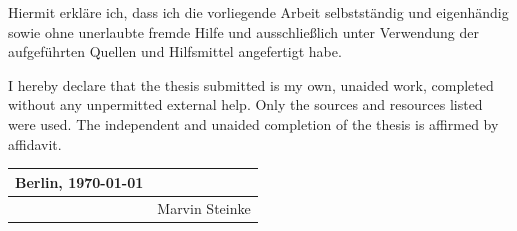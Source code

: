 \documentclass[a4paper, hidelinks]{report}
\begin{document}
\thispagestyle{empty}

Hiermit erkläre ich, dass ich die vorliegende Arbeit selbstständig und
eigenhändig sowie ohne unerlaubte fremde Hilfe und ausschließlich unter
Verwendung der aufgeführten Quellen und Hilfsmittel angefertigt habe.

\noindent I hereby declare that the thesis submitted is my own, unaided work,
completed without any unpermitted external help. Only the sources and resources
listed were used. The independent and unaided completion of the thesis is
affirmed by affidavit.

\vspace{2cm}
\hfill
{
    \renewcommand{\arraystretch}{2}
    \begin{tabular}{l l}
        Berlin, \today \hspace{1em} & \\
        \hline
                                    & Marvin Steinke \hspace{5em}
    \end{tabular}
}

\begin{abstract}
\end{abstract}

\begin{abstract}
\end{abstract}

\tableofcontents

%
%
\end{document}
